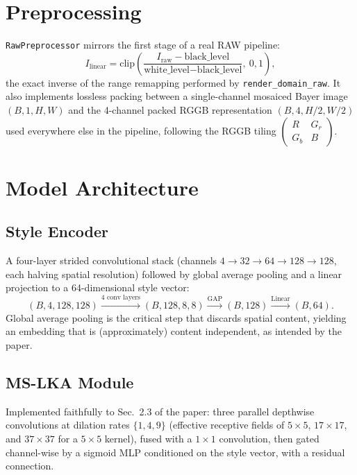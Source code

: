 \documentclass[11pt]{article}
\begin{document}
\section{Preprocessing}

\texttt{RawPreprocessor} mirrors the first stage of a real RAW pipeline:
\begin{equation}
    I_{\text{linear}} = \mathrm{clip}\!\left(
        \frac{I_{\text{raw}} - \text{black\_level}}
             {\text{white\_level} - \text{black\_level}},\ 0, 1
    \right),
\end{equation}
the exact inverse of the range remapping performed by
\texttt{render\_domain\_raw}. It also implements lossless packing between
a single-channel mosaiced Bayer image $(B,1,H,W)$ and the 4-channel
packed RGGB representation $(B,4,H/2,W/2)$ used everywhere else in the
pipeline, following the RGGB tiling
$\begin{pmatrix} R & G_r \\ G_b & B \end{pmatrix}$.

\section{Model Architecture}

\subsection{Style Encoder}
A four-layer strided convolutional stack (channels
$4 \to 32 \to 64 \to 128 \to 128$, each halving spatial resolution)
followed by global average pooling and a linear projection to a
64-dimensional style vector:
\begin{equation}
    (B,4,128,128) \xrightarrow{\text{4 conv layers}} (B,128,8,8)
    \xrightarrow{\text{GAP}} (B,128) \xrightarrow{\text{Linear}} (B,64).
\end{equation}
Global average pooling is the critical step that discards spatial
content, yielding an embedding that is (approximately) content
independent, as intended by the paper.

\subsection{MS-LKA Module}
Implemented faithfully to Sec.~2.3 of the paper: three parallel
depthwise convolutions at dilation rates $\{1,4,9\}$ (effective receptive
fields of $5\times5$, $17\times17$, and $37\times37$ for a $5\times5$
kernel), fused with a $1\times1$ convolution, then gated channel-wise by
a sigmoid MLP conditioned on the style vector, with a residual
connection.
\end{document}
